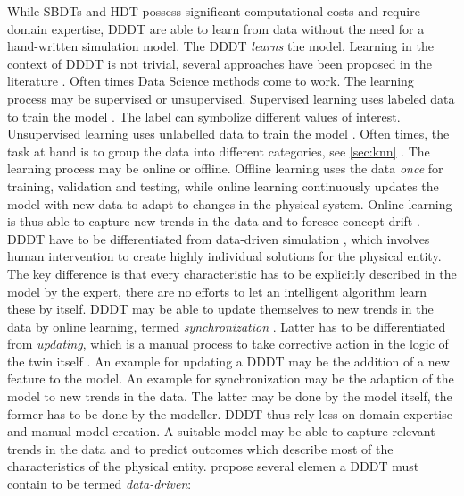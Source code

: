 While SBDTs and HDT possess significant computational costs and require domain expertise, DDDT are able to learn from data without the need for a hand-written simulation model. The DDDT \textit{learns} the model. Learning in the context of DDDT is not trivial, several approaches have been proposed in the literature \autocite{he2019data,Friederich2022,francis2021towards}. Often times Data Science methods come to work. The learning process may be supervised or unsupervised. Supervised learning uses labeled data to train the model \autocite{cunningham2008supervised}. The label can symbolize different values of interest. Unsupervised learning uses unlabelled data to train the model \autocite{barlow1989unsupervised}. Often times, the task at hand is to group the data into different categories, see \autoref{sec:knn} \autocite{Biesinger2019}.
The learning process may be online or offline. Offline learning uses the data \textit{once} for training, validation and testing, while online learning continuously updates the model with new data to adapt to changes in the physical system. Online learning is thus able to capture new trends in the data and to foresee concept drift \autocite{tsymbal2004problem}. DDDT have to be differentiated from data-driven simulation \autocite{Charpentier2014}, which involves human intervention to create highly individual solutions for the physical entity. The key difference is that every characteristic has to be explicitly described in the model by the expert, there are no efforts to let an intelligent algorithm learn these by itself. DDDT may be able to update themselves to new trends in the data by online learning, termed \textit{synchronization} \autocite{reinhardt2019survey}. Latter has to be differentiated from \textit{updating}, which is a manual process to take corrective action in the logic of the twin itself \autocite{schwede2024learning}. An example for updating a DDDT may be the addition of a new feature to the model. An example for synchronization may be the adaption of the model to new trends in the data. The latter may be done by the model itself, the former has to be done by the modeller.
DDDT thus rely less on domain expertise and manual model creation. A suitable model may be able to capture relevant trends in the data and to predict outcomes which describe most of the characteristics of the physical entity. \autocite{francis2021towards} propose several elemen a DDDT must contain to be termed \textit{data-driven}:

